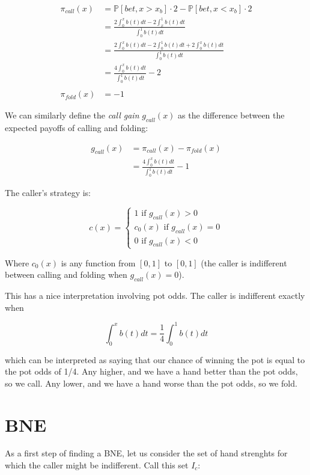 \documentclass[a4paper,12pt]{article}
\begin{document}
\begin{align*}
    \pi_{call}(x) & = \mathbb{P}[bet, x>x_b] \cdot 2 - \mathbb{P}[bet, x<x_b] \cdot 2\\
    & = \frac{2 \int_{0}^{x} b(t) dt - 2 \int_{x}^{1} b(t) dt}{\int_{0}^{1} b(t)dt} \\
    & = \frac{2 \int_{0}^{x} b(t) dt - 2\int_{0}^{1} b(t) dt + 2\int_{0}^{x} b(t) dt}{\int_{0}^{1} b(t)dt} \\
    & = \frac{4 \int_{0}^{x} b(t) dt}{\int_{0}^{1} b(t)dt}  - 2 \\
    & \\
    \pi_{fold}(x) & = -1
\end{align*}

We can similarly define the \textit{call gain} $g_{call}(x)$ as the difference between the expected payoffs of calling and folding:

\begin{align*}
    g_{call}(x) &= \pi_{call}(x) - \pi_{fold}(x) \\
    & = \frac{4 \int_{0}^{x} b(t) dt}{\int_{0}^{1} b(t)dt}  - 1
\end{align*}

The caller's strategy is:

\[
    c(x) = \begin{cases}
        1 \text{ if } g_{call}(x) > 0 \\
        c_0(x) \text{ if } g_{call}(x) = 0 \\
        0 \text{ if } g_{call}(x) < 0
    \end{cases}
\]

Where $c_0(x)$ is any function from $[0, 1]$ to $[0, 1]$ (the caller is indifferent between calling and folding when $g_{call}(x)=0$).

This has a nice interpretation involving pot odds. The caller is indifferent exactly when

\[ \int_{0}^{x} b(t) dt = \frac{1}{4} \int_{0}^{1} b(t)dt \]

which can be interpreted as saying that our chance of winning the pot is equal to the pot odds of 1/4. Any higher, and we have a hand better than the pot odds, so we call. Any lower, and we have a hand worse than the pot odds, so we fold. 

\section{BNE}

As a first step of finding a BNE, let us consider the set of hand strenghts for which the caller might be indifferent. Call this set $I_c$:
\end{document}
